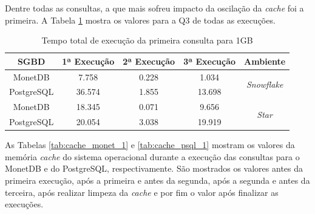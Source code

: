 Dentre todas as consultas, a que mais sofreu impacto da oscilação da \textit{cache} foi a primeira. A Tabela \ref{tab:q1_cache_1} mostra os valores para a Q3 de todas as execuções.

\begin{table}[htpb]
        \centering
        \caption{Tempo total de execução da primeira consulta para 1GB}
        \label{tab:q1_cache_1}
        \begin{tabular}{|c|c|c|c|c|}
        \hline
        SGBD       & 1ª Execução & 2ª Execução & 3ª Execução & Ambiente                            \\ \hline
        MonetDB    & 7.758       & 0.228       & 1.034       & \multirow{2}{*}{\textit{Snowflake}} \\ \cline{1-4}
        PostgreSQL & 36.574      & 1.855       & 13.698      &                                     \\ \hline
        MonetDB    & 18.345      & 0.071       & 9.656       & \multirow{2}{*}{\textit{Star}}      \\ \cline{1-4}
        PostgreSQL & 20.054      & 3.038       & 19.919      &                                     \\ \hline
\end{tabular}
\end{table}

As Tabelas \ref{tab:cache_monet_1} e \ref{tab:cache_psql_1} mostram os valores da memória \textit{cache} do sistema operacional durante a execução das consultas para o MonetDB e do PostgreSQL, respectivamente. São mostrados os valores antes da primeira execução, após a primeira e antes da segunda, após a segunda e antes da terceira, após realizar limpeza da \textit{cache} e por fim o valor após finalizar as execuções.

